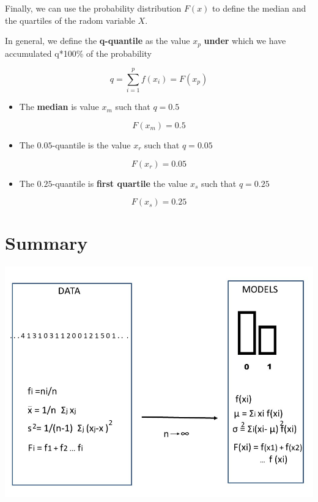 \documentclass[
]{book}
\providecommand{\tightlist}{%
  \setlength{\itemsep}{0pt}\setlength{\parskip}{0pt}}
\begin{document}
Finally, we can use the probability distribution \(F(x)\) to define the median and the quartiles of the radom variable \(X\).

In general, we define the \textbf{q-quantile} as the value \(x_{p}\) \textbf{under} which we have accumulated q*100\% of the probability

\[q=\sum_{i=1}^p f(x_i) = F (x_p)\]

\begin{itemize}
\tightlist
\item
  The \textbf{median} is value \(x_m\) such that \(q=0.5\)
\end{itemize}

\[F(x_{m})=0.5\]

\begin{itemize}
\tightlist
\item
  The \(0.05\)-quantile is the value \(x_{r}\) such that \(q=0.05\)
\end{itemize}

\[F(x_{r})=0.05\]

\begin{itemize}
\tightlist
\item
  The \(0.25\)-quantile is \textbf{first quartile} the value \(x_{s}\) such that \(q=0.25\)
\end{itemize}

\[F(x_{s})=0.25\]

\hypertarget{summary}{%
\section{Summary}\label{summary}}

\includegraphics{./figures/randomvarsum.JPG}
\end{document}
